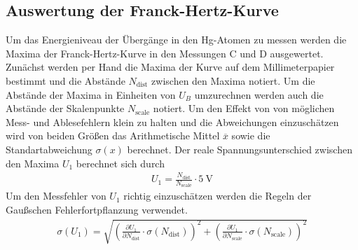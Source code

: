 \subsection{Auswertung der Franck-Hertz-Kurve}
Um das Energieniveau der Übergänge in den Hg-Atomen zu messen werden die Maxima der Franck-Hertz-Kurve in den Messungen C und D
ausgewertet.
Zunächst werden per Hand die Maxima der Kurve auf dem Millimeterpapier bestimmt und die Abstände $N_\text{dist}$ zwischen den
Maxima notiert.
Um die Abstände der Maxima in Einheiten von $U_B$ umzurechnen werden auch die Abstände der Skalenpunkte $N_\text{scale}$ notiert.
Um den Effekt von von möglichen Mess- und Ablesefehlern klein zu halten und die Abweichungen einzuschätzen wird von beiden Größen 
das Arithmetische Mittel $\overline{x}$ sowie die Standartabweichung $\sigma(x)$ berechnet.
Der reale Spannungsunterschied zwischen den Maxima $U_{1}$ berechnet sich durch
\begin{align}
    U_{1} = \frac{N_\text{dist}}{N_\text{scale}}\cdot \qty{5}{\volt}
\end{align}
Um den Messfehler von $U_{1}$ richtig einzuschätzen werden die Regeln der Gaußschen Fehlerfortpflanzung verwendet.
\begin{align}
    \sigma\left(U_{1}\right) = \sqrt{\left(\frac{\partial U_{1}}{\partial N_\text{dist}} \cdot \sigma\left(N_\text{dist}\right) \right)^2%
                                                    +  \left(\frac{\partial U_{1}}{\partial N_\text{scale}} \cdot \sigma\left(N_\text{scale}\right) \right)^2 }
\end{align}

